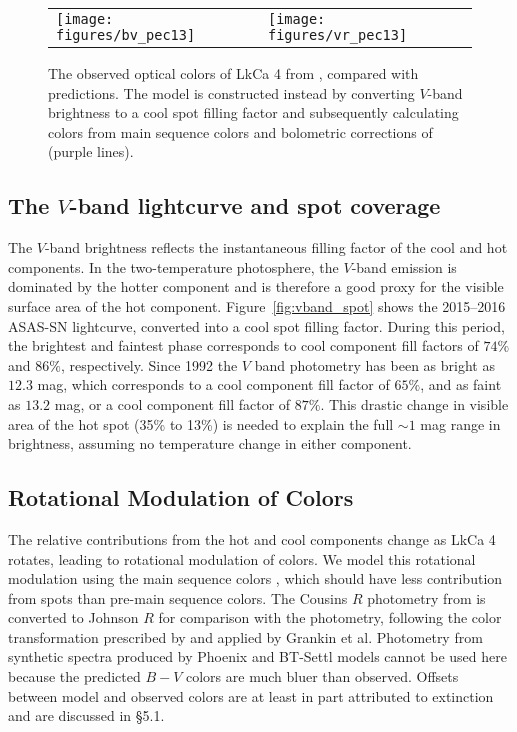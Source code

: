 \documentclass[twocolumn]{emulateapj}%
\begin{document}
\begin{figure*}
 \centering
 \begin{tabular}{ll}
 \texttt{[image: figures/bv\_pec13]} 
    &
   \texttt{[image: figures/vr\_pec13]}
    \end{tabular}
\caption{The observed optical colors of LkCa 4 from \citet{grankin08}, compared with predictions.  The model is constructed instead by converting $V$-band brightness to a cool spot filling factor and subsequently calculating colors from main sequence colors and bolometric corrections of \citet{pecaut13} (purple lines).}
\label{fig:colors}
\end{figure*}


\subsection{The $V$-band lightcurve and spot coverage}\label{sec:rotSpot1}

The  $V$-band brightness reflects the instantaneous filling factor of the cool and hot components.  In the two-temperature photosphere, the $V$-band emission is dominated by the hotter component and is therefore a good proxy for the visible surface area of the hot component.  Figure~\ref{fig:vband_spot} shows the 2015--2016 ASAS-SN lightcurve, converted into a cool spot filling factor.  During this period, the brightest and faintest phase corresponds to cool component fill factors of $74\%$ and $86\%$, respectively.  Since 1992 the $V$ band photometry has been as bright as $12.3$ mag, which corresponds to a cool component fill factor of $65\%$, and as faint as $13.2$ mag, or a cool component fill factor of $87\%$.  This drastic change in visible area of the hot spot (35\% to 13\%) is needed to explain the full $\sim 1$ mag range in brightness, assuming no temperature change in either component.


\subsection{Rotational Modulation of Colors}\label{sec:rotSpot}

The relative contributions from the hot and cool components change as LkCa 4 rotates, leading to rotational modulation of colors.  We model this rotational modulation using the main sequence colors \citep[compiled by][]{pecaut13}, which should have less contribution from spots than  pre-main sequence colors.  The Cousins $R$ photometry from \citet{pecaut13} is converted to Johnson $R$ for comparison with the \citet{grankin08} photometry, following the color transformation prescribed by \citet{landolt83} and applied by Grankin et al.  Photometry from synthetic spectra produced by Phoenix and BT-Settl models cannot be used here because the predicted $B-V$ colors are much bluer than observed.  Offsets between model and observed colors are at least in part attributed to extinction and are discussed in \S 5.1.  
\end{document}
